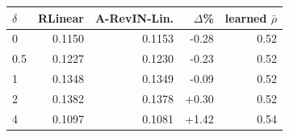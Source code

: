 \begin{tabular}{lrrrr}
\toprule
$\delta$ & RLinear & A-RevIN-Lin. & $\Delta$\% & learned $\bar\rho$ \\
\midrule
0 & 0.1150 & 0.1153 & -0.28 & 0.52 \\
0.5 & 0.1227 & 0.1230 & -0.23 & 0.52 \\
1 & 0.1348 & 0.1349 & -0.09 & 0.52 \\
2 & 0.1382 & 0.1378 & +0.30 & 0.52 \\
4 & 0.1097 & 0.1081 & +1.42 & 0.54 \\
\bottomrule
\end{tabular}